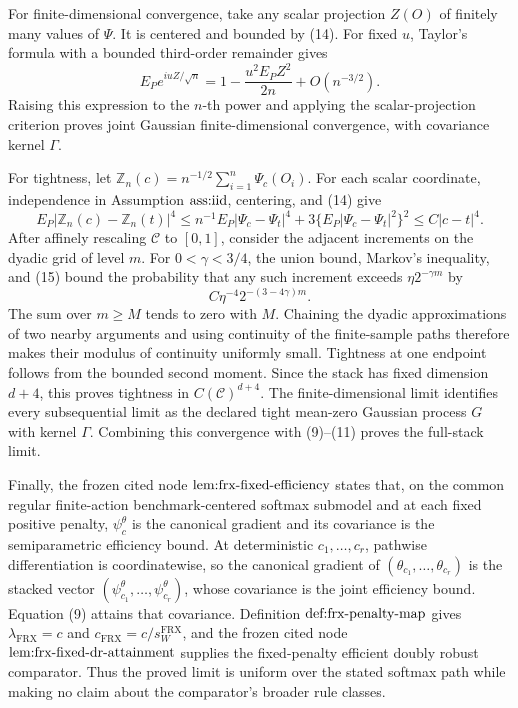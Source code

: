 For finite-dimensional convergence, take any scalar projection \(Z(O)\) of finitely many values of \(\Psi\).  It is centered and bounded by (14).  For fixed \(u\), Taylor's formula with a bounded third-order remainder gives
\[
 E_Pe^{iuZ/\sqrt n}
 =1-\frac{u^2E_PZ^2}{2n}+O(n^{-3/2}).
\]
Raising this expression to the \(n\)-th power and applying the scalar-projection criterion proves joint Gaussian finite-dimensional convergence, with covariance kernel \(\Gamma\).

For tightness, let \(\mathbb Z_n(c)=n^{-1/2}\sum_{i=1}^n\Psi_c(O_i)\).  For each scalar coordinate, independence in Assumption \(\textnormal{ass:iid}\), centering, and (14) give
\[
 E_P|\mathbb Z_n(c)-\mathbb Z_n(t)|^4
 \le n^{-1}E_P|\Psi_c-\Psi_t|^4
 +3\{E_P|\Psi_c-\Psi_t|^2\}^2
 \le C|c-t|^4. \tag{15}
\]
After affinely rescaling \(\mathcal C\) to \([0,1]\), consider the adjacent increments on the dyadic grid of level \(m\).  For \(0<\gamma<3/4\), the union bound, Markov's inequality, and (15) bound the probability that any such increment exceeds \(\eta2^{-\gamma m}\) by
\[
 C\eta^{-4}2^{-(3-4\gamma)m}.
\]
The sum over \(m\ge M\) tends to zero with \(M\).  Chaining the dyadic approximations of two nearby arguments and using continuity of the finite-sample paths therefore makes their modulus of continuity uniformly small.  Tightness at one endpoint follows from the bounded second moment.  Since the stack has fixed dimension \(d+4\), this proves tightness in \(C(\mathcal C)^{d+4}\).  The finite-dimensional limit identifies every subsequential limit as the declared tight mean-zero Gaussian process \(G\) with kernel \(\Gamma\).  Combining this convergence with (9)--(11) proves the full-stack limit.

Finally, the frozen cited node \(\textnormal{lem:frx-fixed-efficiency}\) states that, on the common regular finite-action benchmark-centered softmax submodel and at each fixed positive penalty, \(\psi_c^\theta\) is the canonical gradient and its covariance is the semiparametric efficiency bound.  At deterministic \(c_1,\ldots,c_r\), pathwise differentiation is coordinatewise, so the canonical gradient of \((\theta_{c_1},\ldots,\theta_{c_r})\) is the stacked vector \((\psi_{c_1}^\theta,\ldots,\psi_{c_r}^\theta)\), whose covariance is the joint efficiency bound.  Equation (9) attains that covariance.  Definition \(\textnormal{def:frx-penalty-map}\) gives \(\lambda_{\mathrm{FRX}}=c\) and \(c_{\mathrm{FRX}}=c/s_W^{\mathrm{FRX}}\), and the frozen cited node \(\textnormal{lem:frx-fixed-dr-attainment}\) supplies the fixed-penalty efficient doubly robust comparator.  Thus the proved limit is uniform over the stated softmax path while making no claim about the comparator's broader rule classes.

